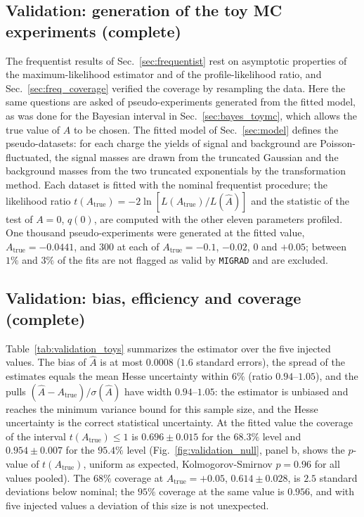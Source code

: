 \subsection{Validation: generation of the toy MC experiments (complete)}
The frequentist results of Sec.~\ref{sec:frequentist} rest on asymptotic properties of the maximum-likelihood estimator and of the profile-likelihood ratio, and Sec.~\ref{sec:freq_coverage} verified the coverage by resampling the data. Here the same questions are asked of pseudo-experiments generated from the fitted model, as was done for the Bayesian interval in Sec.~\ref{sec:bayes_toymc}, which allows the true value of $A$ to be chosen. The fitted model of Sec.~\ref{sec:model} defines the pseudo-datasets: for each charge the yields of signal and background are Poisson-fluctuated, the signal masses are drawn from the truncated Gaussian and the background masses from the two truncated exponentials by the transformation method. Each dataset is fitted with the nominal frequentist procedure; the likelihood ratio $t(A_{\mathrm{true}})=-2\ln[L(A_{\mathrm{true}})/L(\hat A)]$ and the statistic of the test of $A=0$, $q(0)$, are computed with the other eleven parameters profiled. One thousand pseudo-experiments were generated at the fitted value, $A_{\mathrm{true}}=-0.0441$, and $300$ at each of $A_{\mathrm{true}}=-0.1$, $-0.02$, $0$ and $+0.05$; between $1\%$ and $3\%$ of the fits are not flagged as valid by \texttt{MIGRAD} and are excluded.

\subsection{Validation: bias, efficiency and coverage (complete)}
Table~\ref{tab:validation_toys} summarizes the estimator over the five injected values. The bias of $\hat A$ is at most $0.0008$ ($1.6$ standard errors), the spread of the estimates equals the mean Hesse uncertainty within $6\%$ (ratio $0.94$--$1.05$), and the pulls $(\hat A-A_{\mathrm{true}})/\sigma(\hat A)$ have width $0.94$--$1.05$: the estimator is unbiased and reaches the minimum variance bound for this sample size, and the Hesse uncertainty is the correct statistical uncertainty. At the fitted value the coverage of the interval $t(A_{\mathrm{true}})\leq1$ is $0.696\pm0.015$ for the $68.3\%$ level and $0.954\pm0.007$ for the $95.4\%$ level (Fig.~\ref{fig:validation_null}, panel b, shows the $p$-value of $t(A_{\mathrm{true}})$, uniform as expected, Kolmogorov-Smirnov $p=0.96$ for all values pooled). The $68\%$ coverage at $A_{\mathrm{true}}=+0.05$, $0.614\pm0.028$, is $2.5$ standard deviations below nominal; the $95\%$ coverage at the same value is $0.956$, and with five injected values a deviation of this size is not unexpected.

